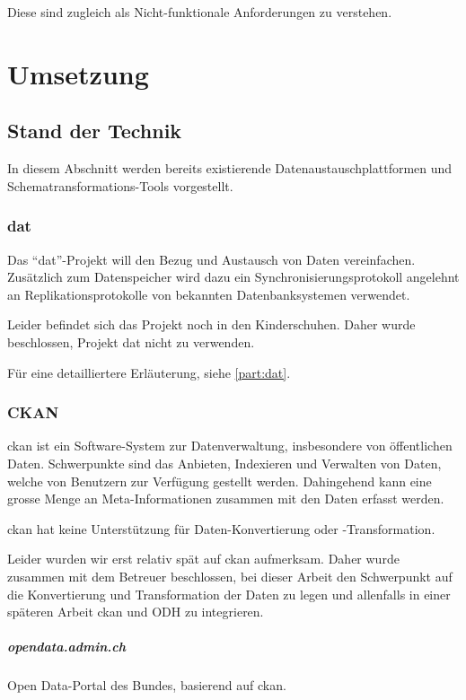 Diese sind zugleich als Nicht-funktionale Anforderungen zu verstehen.

\chapter{Umsetzung}

\section{Stand der Technik} \label{sec:tb:state-of-the-art}

In diesem Abschnitt werden bereits existierende Datenaustauschplattformen und Schematransformations-Tools vorgestellt.

\subsection{dat}
Das ``dat''-Projekt will den Bezug und Austausch von Daten vereinfachen. Zusätzlich zum Datenspeicher wird dazu ein Synchronisierungsprotokoll angelehnt an Replikationsprotokolle von bekannten Datenbanksystemen verwendet.

Leider befindet sich das Projekt noch in den Kinderschuhen. Daher wurde beschlossen, Projekt dat nicht zu verwenden.

Für eine detailliertere Erläuterung, siehe \cref{part:dat}.

\subsection{CKAN}
\gls{ckan} ist ein Software-System zur Datenverwaltung, insbesondere von öffentlichen Daten. Schwerpunkte sind das Anbieten, Indexieren und Verwalten von Daten, welche von Benutzern zur Verfügung gestellt werden. Dahingehend kann eine grosse Menge an Meta-Informationen zusammen mit den Daten erfasst werden. 

\gls{ckan} hat keine Unterstützung für Daten-Konvertierung oder -Transformation.

Leider wurden wir erst relativ spät auf \gls{ckan} aufmerksam. Daher wurde zusammen mit dem Betreuer beschlossen, bei dieser Arbeit den Schwerpunkt auf die Konvertierung und Transformation der Daten zu legen und allenfalls in einer späteren Arbeit \gls{ckan} und ODH zu integrieren.

\paragraph{opendata.admin.ch}
Open Data-Portal des Bundes, basierend auf \gls{ckan}.

